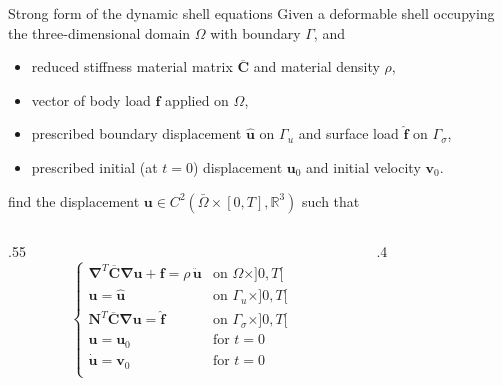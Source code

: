 \documentclass[aspectratio=169]{beamer}
\begin{document}
{
\begin{frame}{Strong form of the dynamic shell equations}
  \color{white}
  Given a deformable shell occupying the three-dimensional domain $\Omega$ with boundary $\Gamma$, and
  \begin{itemize}
    \color{white}
    \item reduced stiffness material matrix $\overline{\mathbf C}$ and material density $\rho$,
    \item vector of body load $\mathbf f$ applied on $\Omega$,
    \item prescribed boundary displacement $\mathbf{\hat u}$ on $\Gamma_{u}$ and surface load $\mathbf{\hat f}$ on $\Gamma_{\sigma}$,
    \item prescribed initial (at $t=0$) displacement $\mathbf u_{0}$ and initial velocity $\mathbf v_{0}$.
  \end{itemize}
  find the displacement $\mathbf u\in C^{2}(\bar\Omega\times[0,T],\mathbb R^{3})$ such that
  \begin{columns}[T]
    \begin{column}{.55\textwidth}
      \color{white}
      \vspace{0.2cm}
      $$\begin{cases}
          \boldsymbol\nabla^T \overline{\mathbf C}\boldsymbol\nabla \mathbf u+\mathbf f=\rho\, \mathbf{\ddot{u}} & \text{on }\Omega\times]0,T[         \\
          \mathbf u=\mathbf{\hat u}                                                                              & \text{on } \Gamma_u\times]0,T[      \\
          \mathbf N^T\overline{\mathbf C}\boldsymbol\nabla\mathbf  u=\mathbf{\hat f}                             & \text{on } \Gamma_\sigma\times]0,T[ \\
          \mathbf u=\mathbf u_0                                                                                  & \text{for } t=0                     \\
          \mathbf{\dot u} =\mathbf v_0                                                                           & \text{for } t=0                     \\
        \end{cases}$$
    \end{column}
    \hfill
    \begin{column}{.4\textwidth}
      \vspace{-0.6cm}

\end{column}
\end{columns}
\end{frame}}
\end{document}
